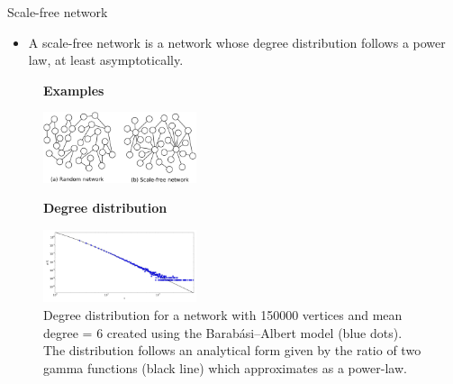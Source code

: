 \documentclass[notheorems, aspectratio=54]{beamer}
\begin{document}
\begin{frame}{Scale-free network}
  \begin{itemize}
   \item A scale-free network\cite{wiki:scale_free_network} is a network whose degree distribution follows a power law, at least asymptotically.
  \end{itemize}
  \begin{figure}
    \centering
    \textbf{Examples}\par\medskip
    \includegraphics[width=0.4\textwidth]{scale_free_network.png}
  \end{figure}
  \begin{figure}
    \centering
    \textbf{Degree distribution}\par\medskip
    \includegraphics[width=0.4\textwidth]{scale_free_distribution.png}
    \caption{Degree distribution for a network with 150000 vertices and mean degree = 6 created using the Barabási–Albert model (blue dots). The distribution follows an analytical form given by the ratio of two gamma functions (black line) which approximates as a power-law.}
  \end{figure}
\end{frame}
\end{document}
